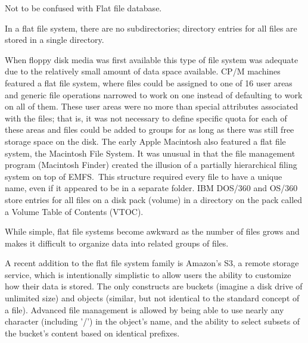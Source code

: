 Not to be confused with Flat file database.



In a flat file system, there are no subdirectories; directory entries for all
files are stored in a single directory.



When floppy disk media was first available this type of file system was adequate
due to the relatively small amount of data space available. CP/M machines
featured a flat file system, where files could be assigned to one of 16 user
areas and generic file operations narrowed to work on one instead of defaulting
to work on all of them. These user areas were no more than special attributes
associated with the files; that is, it was not necessary to define specific
quota for each of these areas and files could be added to groups for as long as
there was still free storage space on the disk. The early Apple Macintosh also
featured a flat file system, the Macintosh File System. It was unusual in that
the file management program (Macintosh Finder) created the illusion of a
partially hierarchical filing system on top of EMFS.\ This structure required
every file to have a unique name, even if it appeared to be in a separate
folder. IBM DOS/360 and OS/360 store entries for all files on a disk pack
(volume) in a directory on the pack called a Volume Table of Contents (VTOC).



While simple, flat file systems become awkward as the number of files grows and
makes it difficult to organize data into related groups of files.



A recent addition to the flat file system family is Amazon's S3, a remote
storage service, which is intentionally simplistic to allow users the ability to
customize how their data is stored. The only constructs are buckets (imagine a
disk drive of unlimited size) and objects (similar, but not identical to the
standard concept of a file). Advanced file management is allowed by being able
to use nearly any character (including '/') in the object's name, and the
ability to select subsets of the bucket's content based on identical prefixes. 



\subsubsectionend



\subsectionend
















